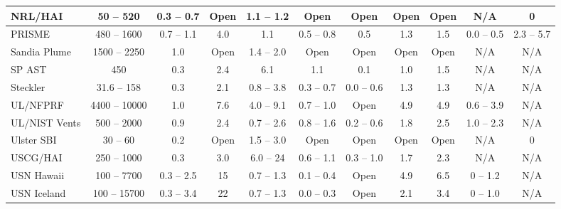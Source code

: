 \begin{landscape}
\begin{longtable}{|l|c|c|c|c|c|c|c|c|c|c|}
NRL/HAI             & 50 -- 520     & 0.3 -- 0.7    & Open  & 1.1 -- 1.2        & Open                & Open          & Open        & Open        & N/A                   & 0                     \\ \hline
PRISME              & 480 -- 1600   & 0.7 -- 1.1    & 4.0   & 1.1               & 0.5 -- 0.8          & 0.5           & 1.3         & 1.5         & 0.0 -- 0.5            & 2.3 -- 5.7            \\ \hline
Sandia Plume        & 1500 -- 2250  & 1.0           & Open  & 1.4 -- 2.0        & Open                & Open          & Open        & Open        & N/A                   & N/A                   \\ \hline
SP AST              & 450           & 0.3           & 2.4   & 6.1               & 1.1                 & 0.1           & 1.0         & 1.5         & N/A                   & N/A                   \\ \hline
Steckler            & 31.6 -- 158   & 0.3           & 2.1   & 0.8 -- 3.8        & 0.3 -- 0.7          & 0.0 -- 0.6    & 1.3         & 1.3         & N/A                   & N/A                   \\ \hline
UL/NFPRF            & 4400 -- 10000 & 1.0           & 7.6   & 4.0 -- 9.1        & 0.7 -- 1.0          & Open          & 4.9         & 4.9         & 0.6 -- 3.9            & N/A                   \\ \hline
UL/NIST Vents       & 500 -- 2000   & 0.9           & 2.4   & 0.7 -- 2.6        & 0.8 -- 1.6          & 0.2 -- 0.6    & 1.8         & 2.5         & 1.0 -- 2.3            & N/A                   \\ \hline
Ulster SBI          & 30 -- 60      & 0.2           & Open  & 1.5 -- 3.0        & Open                & Open          & Open        & Open        & N/A                   & 0                     \\ \hline
USCG/HAI            & 250 -- 1000   & 0.3           & 3.0   & 6.0 -- 24         & 0.6 -- 1.1          & 0.3 -- 1.0    & 1.7         & 2.3         & N/A                   & N/A                   \\ \hline
USN Hawaii          & 100 -- 7700   & 0.3 -- 2.5    & 15    & 0.7 -- 1.3        & 0.1 -- 0.4          & Open          & 4.9         & 6.5         & 0 -- 1.2              & N/A                   \\ \hline
USN Iceland         & 100 -- 15700  & 0.3 -- 3.4    & 22    & 0.7 -- 1.3        & 0.0 -- 0.3          & Open          & 2.1         & 3.4         & 0 -- 1.0              & N/A                   \\ \hline

\end{longtable}
\end{landscape}
